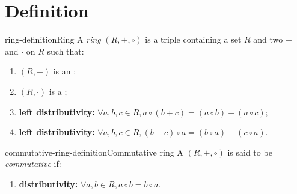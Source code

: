 \documentclass[preview]{standalone}
\begin{document}
\genpage

\section{Definition}

\begin{snippetdefinition}{ring-definition}{Ring}
    A \textit{ring} \((R, +, \circ)\) is a triple containing a set \(R\) and two 
    \(+\) and \(\cdot\) on \(R\) such that:
    \begin{enumerate}
        \item \((R, +)\) is an \abeliangroup;
        \item \((R, \cdot)\) is a \monoid;
        \item \textbf{left distributivity:} \(\forall a,b,c\in R, a\circ(b+c) = (a\circ b) + (a \circ c)\);
        \item \textbf{left distributivity:} \(\forall a,b,c\in R, (b+c)\circ a = (b\circ a) + (c \circ a)\).
    \end{enumerate}
\end{snippetdefinition}

\begin{snippetdefinition}{commutative-ring-definition}{Commutative ring}
    A \ring \((R, +, \circ)\) is said to be \textit{commutative} if:
    \begin{enumerate}
        \item \textbf{distributivity:} \(\forall a,b\in R, a\circ b = b\circ a\).
    \end{enumerate}
\end{snippetdefinition}
\end{document}
